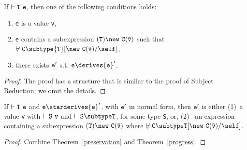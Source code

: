 \begin{theorem}[Progress] 
\label{progress}
If $\vdash {\tt T\ e}$, then one of the following conditions holds:
\begin{enumerate}
\item {\tt e} is a value {\tt v}, 
\item {\tt e} contains a subexpression ${\tt (T)\new\ C(\bar{\tt
v})}$ such that
$\not\vdash {\tt C} \subtype {\tt T}[{\tt \new\ C(\bar{\tt v})}/\self]$,
\item there exists ${\tt e}'$ s.t. ${\tt e} \derives {\tt e}'$.
\end{enumerate}
\end{theorem}

\begin{proof}
The proof has a structure that is similar to the proof of Subject Reduction;
we omit the details.
\end{proof}

\begin{theorem} 
\label{type-soundness}
If $\vdash {\tt T\ e}$ and ${\tt e} \starderives {\tt e}'$, with ${\tt
e}'$ in normal form, then ${\tt e}'$ is either (1)~a value {\tt v}
with $\vdash {\tt S\ v}$ and $\vdash {\tt S
\subtype T}$, for some type {\tt S}, or, (2)~ an expression containing
a subexpression ${\tt (T)\new\ {\tt C(\bar{\tt v})}}$ where 
$\not\vdash \tt C\subtype T[\new\ C(\bar{\tt v})/\self]$.

\end{theorem}

\begin{proof}
Combine Theorem~\ref{preservation} and Theorem~\ref{progress}.
\end{proof}

